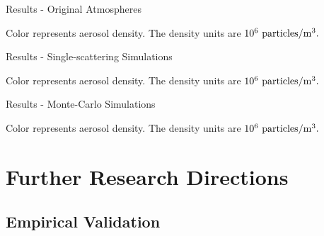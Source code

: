 \documentclass[compress,red,12pt]{beamer}
\begin{document}

\begin{frame}{Results - Original Atmospheres}
  \centerline{\def\svgwidth{1.15\linewidth}\footnotesize{}}
  \centerline{\footnotesize Color represents aerosol density. The
    density units are $10^{6}~{\rm particles}/{\rm m}^3.$}
\end{frame}


\begin{frame}{Results - Single-scattering Simulations}
  \centerline{\def\svgwidth{1.15\linewidth}\footnotesize{}}
  \centerline{\footnotesize Color represents aerosol density. The
    density units are $10^{6}~{\rm particles}/{\rm m}^3.$}
\end{frame}


\begin{frame}{Results - Monte-Carlo Simulations}
  \centerline{\def\svgwidth{1.15\linewidth}\footnotesize{}}
  \centerline{\footnotesize Color represents aerosol density. The
    density units are $10^{6}~{\rm particles}/{\rm m}^3.$}
\end{frame}


\section{Further Research Directions}


\subsection{Empirical Validation}
\end{document}
